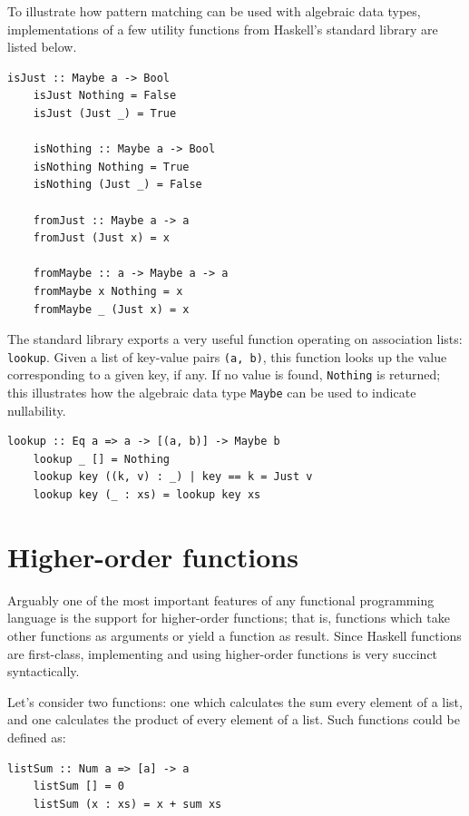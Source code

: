 \documentclass[UdineBachThesis,american,11pt]{PhdThesis}
\begin{document}
  To illustrate how pattern matching can be used with algebraic data types,
  implementations of a few utility functions from Haskell's standard library are
  listed below.

  \begin{Verbatim}[gobble=4,fontsize=\small]
    isJust :: Maybe a -> Bool
    isJust Nothing = False
    isJust (Just _) = True

    isNothing :: Maybe a -> Bool
    isNothing Nothing = True
    isNothing (Just _) = False

    fromJust :: Maybe a -> a
    fromJust (Just x) = x

    fromMaybe :: a -> Maybe a -> a
    fromMaybe x Nothing = x
    fromMaybe _ (Just x) = x
  \end{Verbatim}

  The standard library exports a very useful function operating on association
  lists: \mbox{\texttt{lookup}}. Given a list of key-value pairs
  \mbox{\texttt{(a, b)}}, this function looks up the value corresponding to a
  given key, if any. If no value is found, \mbox{\texttt{Nothing}} is returned;
  this illustrates how the algebraic data type \mbox{\texttt{Maybe}} can be used
  to indicate nullability.

  \begin{Verbatim}[gobble=4,fontsize=\small]
    lookup :: Eq a => a -> [(a, b)] -> Maybe b
    lookup _ [] = Nothing
    lookup key ((k, v) : _) | key == k = Just v
    lookup key (_ : xs) = lookup key xs
  \end{Verbatim}

  \section{Higher-order functions}
  \label{section:higher-order-functions}

  Arguably one of the most important features of any functional programming
  language is the support for higher-order functions; that is, functions which
  take other functions as arguments or yield a function as result. Since Haskell
  functions are first-class, implementing and using higher-order functions is
  very succinct syntactically.

  Let's consider two functions: one which calculates the sum every element of a
  list, and one calculates the product of every element of a list. Such
  functions could be defined as:

  \begin{Verbatim}[gobble=4,fontsize=\small]
    listSum :: Num a => [a] -> a
    listSum [] = 0
    listSum (x : xs) = x + sum xs
  \end{Verbatim}
\end{document}
